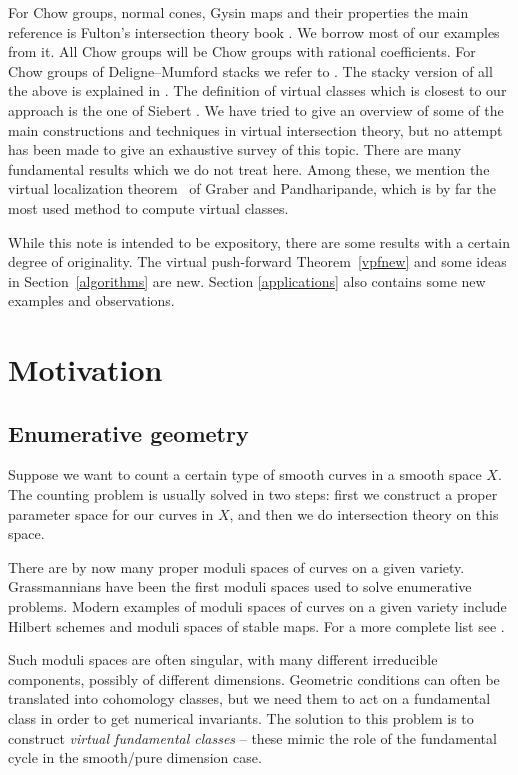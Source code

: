 \documentclass[pdftex]{sigma}
\numberwithin{equation}{section}
\theoremstyle{plain}
\theoremstyle{definition}
\theoremstyle{remark}
\begin{document}
For Chow groups, normal cones, Gysin maps and their properties the main reference is Fulton's intersection theory book \cite{Fulton}. We borrow most of our examples from it. All Chow groups will be Chow groups with rational coefficients. For Chow groups of Deligne--Mumford stacks we refer to \cite{vis}. The stacky version of all the above is explained in \cite{BerFan}. The definition of virtual classes which is closest to our approach is the one of Siebert \cite{siebert}. We have tried to give an overview of some of the main constructions and techniques in virtual intersection theory, but no attempt has been made to give an exhaustive survey of this topic. There are many fundamental results which we do not treat here. Among these, we mention the virtual localization theorem~\cite{grpa} of Graber and Pandharipande, which is by far the most used method to compute virtual classes.

While this note is intended to be expository, there are some results with a certain degree of originality. The virtual push-forward Theorem~\ref{vpfnew} and some ideas in Section~\ref{algorithms} are new. Section \ref{applications} also contains some new examples and observations.

\section{Motivation}

\subsection{Enumerative geometry} Suppose we want to count a certain type of smooth curves in a smooth space $X$. The counting problem is usually solved in two steps: first we construct a proper parameter space for our curves in $X$, and then we do intersection theory on this space.

There are by now many proper moduli spaces of curves on a given variety. Grassmannians have been the first moduli spaces used to solve enumerative problems. Modern examples of moduli spaces of curves on a given variety include Hilbert schemes and moduli spaces of stable maps. For a more complete list see \cite{rt}.

Such moduli spaces are often singular, with many different irreducible components, possibly of different dimensions. Geometric conditions can often be translated into cohomology classes, but we need them to act on a fundamental class in order to get numerical invariants. The solution to this problem is to construct \emph{virtual fundamental classes} -- these mimic the role of the fundamental cycle in the smooth/pure dimension case.
\end{document}
